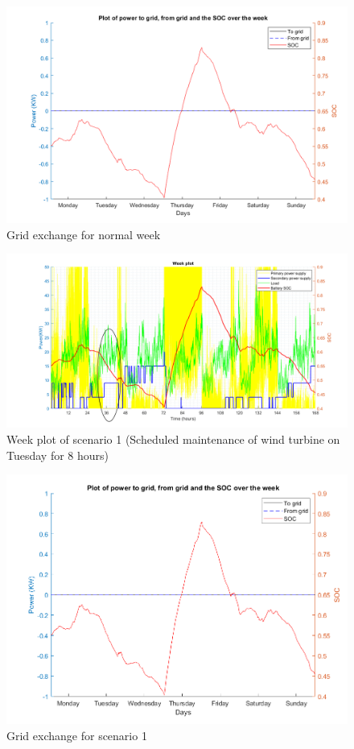 \begin{figure}[H]
    \centering
    \includegraphics[width=0.7 \linewidth]{Final_report/Images/to_from_SOC_normal.png}
    \caption{Grid exchange for normal week}
    \label{fig:grid_ex_normal}
\end{figure}

\begin{figure}[H]
    \centering
    \includegraphics[width=1 \linewidth]{Final_report/Images/Week_plot_s1.png}
    \caption{Week plot of scenario 1 (Scheduled maintenance of wind turbine on Tuesday for 8 hours)}
    \label{fig:week_plot_s1}
\end{figure}

\begin{figure}[H]
    \centering
    \includegraphics[width=0.7 \linewidth]{Final_report/Images/to_from_SOC_s1.png}
    \caption{Grid exchange for scenario 1}
    \label{fig:grid_s1}
\end{figure}

